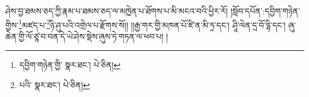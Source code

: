 ཤེས་བྱ་ཐམས་ཅད་ཀྱི་རྣམ་པ་ཐམས་ཅད་ལ་མཁྱེན་པ་ཐོགས་པ་མི་མངའ་བའི་ཕྱིར་རོ། །སློབ་དཔོན་:དབྱིག་གཉེན་གྱིས་\footnote{དབྱིག་གཉེན་གྱི་  སྣར་ཐང་།  པེ་ཅིན། }མཛད་པ་\footnote{པའི་  སྣར་ཐང་།  པེ་ཅིན། }ཉི་ཤུ་པའི་འགྲེལ་པ་རྫོགས་སོ།། །།རྒྱ་གར་གྱི་མཁན་པོ་ཛི་ན་མི་ཏྲ་དང་། ཤཱི་ལེན་དྲ་བོ་དྷི་དང་། ཞུ་ཆེན་གྱི་ལོ་ཙཱ་བ་བན་དེ་ཡེ་ཤེས་སྡེས་ཞུས་ཏེ་གཏན་ལ་ཕབ་པ། །